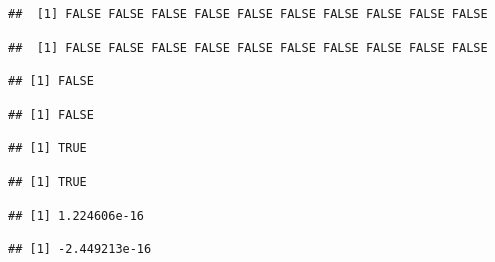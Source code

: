 \documentclass[krantz2]{krantz}\usepackage{knitr}%
\begin{document}
\begin{warningbox}
\begin{knitrout}\footnotesize
{}\color{fgcolor}\begin{kframe}
\begin{alltt}
 \hlopt{==}  
\end{alltt}
\begin{verbatim}
##  [1] FALSE FALSE FALSE FALSE FALSE FALSE FALSE FALSE FALSE FALSE
\end{verbatim}
\begin{alltt}
 \hlopt{<}  
\end{alltt}
\begin{verbatim}
##  [1] FALSE FALSE FALSE FALSE FALSE FALSE FALSE FALSE FALSE FALSE
\end{verbatim}
\begin{alltt}
 \hlopt{==}  
\end{alltt}
\begin{verbatim}
## [1] FALSE
\end{verbatim}
\begin{alltt}
\hlstd{(} \hlopt{*}  \hlopt{==} 
\end{alltt}
\begin{verbatim}
## [1] FALSE
\end{verbatim}
\begin{alltt}
\hlstd{(} \hlopt{<} 
\end{alltt}
\begin{verbatim}
## [1] TRUE
\end{verbatim}
\begin{alltt}
\hlstd{(}\hlstd{(} \hlopt{*}  \hlopt{<} 
\end{alltt}
\begin{verbatim}
## [1] TRUE
\end{verbatim}
\begin{alltt}
\end{alltt}
\begin{verbatim}
## [1] 1.224606e-16
\end{verbatim}
\begin{alltt}
\hlstd{(} \hlopt{*} 
\end{alltt}
\begin{verbatim}
## [1] -2.449213e-16
\end{verbatim}
\end{kframe}
\end{knitrout}
\end{warningbox}
\end{document}
